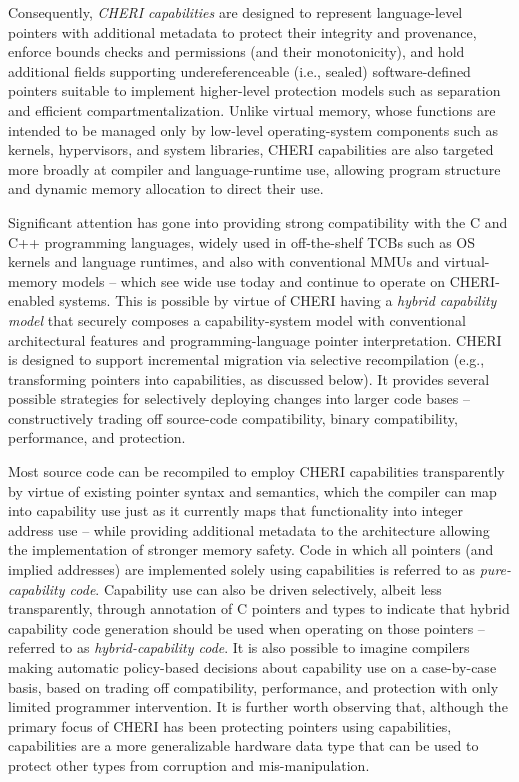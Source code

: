 Consequently, \textit{CHERI capabilities} are designed to represent
language-level pointers with additional metadata to protect their integrity
and provenance, enforce bounds checks and permissions (and their
monotonicity), and hold additional fields supporting undereferenceable
(i.e., sealed) software-defined
pointers suitable to implement higher-level protection models such as
separation and efficient compartmentalization.
Unlike virtual memory, whose functions are intended to be managed only by
low-level operating-system components such as kernels, hypervisors, and system
libraries, CHERI capabilities are also targeted more broadly at compiler and
language-runtime use, allowing program structure and dynamic memory allocation
to direct their use.

Significant attention has gone into providing strong compatibility with the C
and C++ programming languages, widely used in off-the-shelf TCBs such as
OS kernels and language runtimes, and also with conventional MMUs and
virtual-memory models -- which see wide use today and continue to operate on
CHERI-enabled systems.
This is possible by virtue of CHERI having a \textit{hybrid capability model}
that
securely
composes a capability-system model with conventional architectural
features and programming-language pointer interpretation.
CHERI is designed to support incremental migration via selective recompilation
(e.g., transforming pointers into capabilities, as discussed below).
It provides several possible strategies for selectively deploying changes
into larger code bases -- constructively trading off source-code
compatibility, binary compatibility, performance, and protection.

Most source code can be recompiled to employ CHERI capabilities transparently
by virtue of existing pointer syntax and semantics, which the compiler can map
into capability use just as it currently maps that functionality into integer
address use -- while providing additional metadata to the architecture
allowing the implementation of stronger memory safety.
Code in which all pointers (and implied addresses) are implemented
solely using capabilities is referred to as \textit{pure-capability code}.
Capability use can also be driven selectively, albeit less transparently,
through annotation of C pointers and types to indicate that hybrid capability
code generation should be used when operating on those pointers -- referred to
as \textit{hybrid-capability code}.
It is also possible to imagine compilers making automatic policy-based
decisions about capability use on a case-by-case basis, based on trading off
compatibility, performance, and protection with only limited programmer
intervention.
It is further worth observing that, although the primary focus of CHERI has
been protecting pointers using capabilities, capabilities are a more
generalizable hardware data type that can be used to protect other types from
corruption and mis-manipulation.



